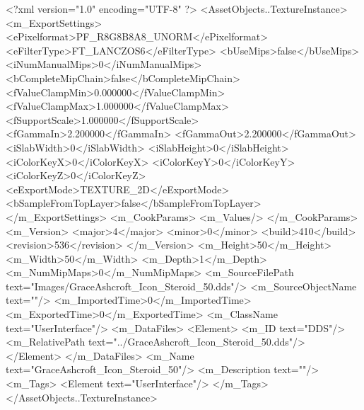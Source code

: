 <?xml version="1.0" encoding="UTF-8" ?>
<AssetObjects..TextureInstance>
	<m_ExportSettings>
		<ePixelformat>PF_R8G8B8A8_UNORM</ePixelformat>
		<eFilterType>FT_LANCZOS6</eFilterType>
		<bUseMips>false</bUseMips>
		<iNumManualMips>0</iNumManualMips>
		<bCompleteMipChain>false</bCompleteMipChain>
		<fValueClampMin>0.000000</fValueClampMin>
		<fValueClampMax>1.000000</fValueClampMax>
		<fSupportScale>1.000000</fSupportScale>
		<fGammaIn>2.200000</fGammaIn>
		<fGammaOut>2.200000</fGammaOut>
		<iSlabWidth>0</iSlabWidth>
		<iSlabHeight>0</iSlabHeight>
		<iColorKeyX>0</iColorKeyX>
		<iColorKeyY>0</iColorKeyY>
		<iColorKeyZ>0</iColorKeyZ>
		<eExportMode>TEXTURE_2D</eExportMode>
		<bSampleFromTopLayer>false</bSampleFromTopLayer>
	</m_ExportSettings>
	<m_CookParams>
		<m_Values/>
	</m_CookParams>
	<m_Version>
		<major>4</major>
		<minor>0</minor>
		<build>410</build>
		<revision>536</revision>
	</m_Version>
	<m_Height>50</m_Height>
	<m_Width>50</m_Width>
	<m_Depth>1</m_Depth>
	<m_NumMipMaps>0</m_NumMipMaps>
	<m_SourceFilePath text="Images/GraceAshcroft_Icon_Steroid_50.dds"/>
	<m_SourceObjectName text=""/>
	<m_ImportedTime>0</m_ImportedTime>
	<m_ExportedTime>0</m_ExportedTime>
	<m_ClassName text="UserInterface"/>
	<m_DataFiles>
		<Element>
			<m_ID text="DDS"/>
			<m_RelativePath text="../GraceAshcroft_Icon_Steroid_50.dds"/>
		</Element>
	</m_DataFiles>
	<m_Name text="GraceAshcroft_Icon_Steroid_50"/>
	<m_Description text=""/>
	<m_Tags>
		<Element text="UserInterface"/>
	</m_Tags>
</AssetObjects..TextureInstance>
